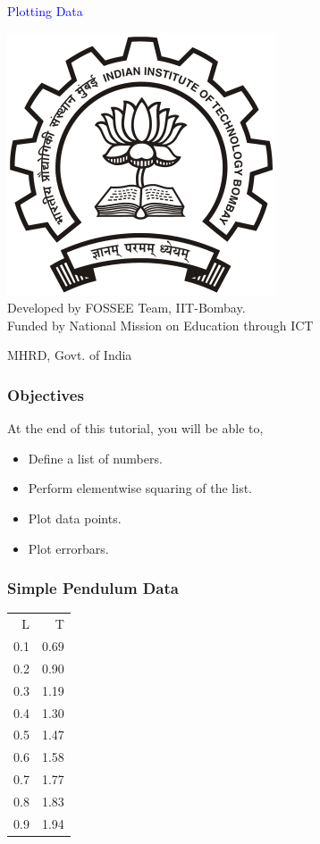 \documentclass[presentation]{beamer}
\title{}
\author{FOSSEE}
\date{}
\begin{document}
\begin{frame}

\begin{center}
\textcolor{blue}{Plotting Data}
\end{center}
 \begin{center}
\includegraphics[scale=0.25]{../images/iitb-logo.png}\\
Developed by FOSSEE Team, IIT-Bombay. \\ 
Funded by National Mission on Education through ICT

MHRD, Govt. of India
\end{center}
\end{frame}
\begin{frame}
\frametitle{Objectives}
\label{sec-2}

  At the end of this tutorial, you will be able to,

\begin{itemize}
\item Define a list of numbers.
\item Perform elementwise squaring of the list.
\item Plot data points.
\item Plot errorbars.
\end{itemize}
  
\end{frame}
\begin{frame}
\frametitle{Simple Pendulum Data}
\label{sec-3}




\begin{center}
\begin{tabular}{rr}
   L  &     T  \\
 0.1  &  0.69  \\
 0.2  &  0.90  \\
 0.3  &  1.19  \\
 0.4  &  1.30  \\
 0.5  &  1.47  \\
 0.6  &  1.58  \\
 0.7  &  1.77  \\
 0.8  &  1.83  \\
 0.9  &  1.94  \\
\end{tabular}
\end{center}


  
\end{frame}
\end{document}
